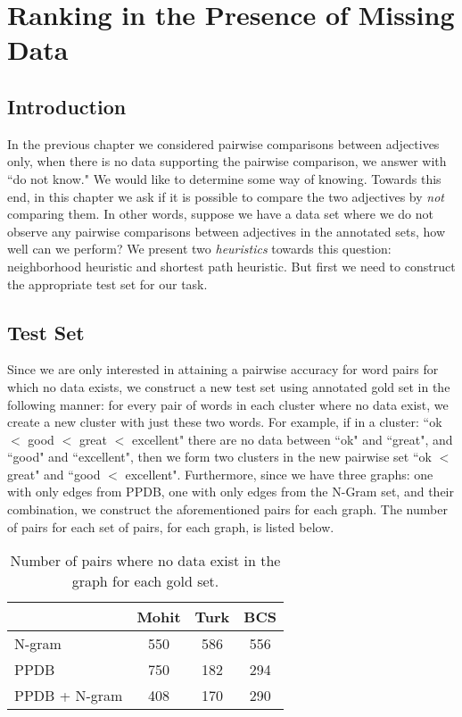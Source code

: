 \section{Ranking in the Presence of Missing Data}

\subsection{Introduction}

In the previous chapter we considered pairwise comparisons between adjectives only, when there is no data supporting the pairwise comparison, we answer with ``do not know."  We would like to determine some way of knowing. Towards this end, in this chapter we ask if it is possible to compare the two adjectives by \textit{not} comparing them. In other words, suppose we have a data set where we do not observe any pairwise comparisons between adjectives in the annotated sets, how well can we perform? We present two \textit{heuristics} towards this question: neighborhood heuristic and shortest path heuristic. But first we need to construct the appropriate test set for our task.


\subsection{Test Set}

Since we are only interested in attaining a pairwise accuracy for word pairs for which no data exists, we construct a new test set using annotated gold set in the following manner: for every pair of words in each cluster where no data exist, we create a new cluster with just these two words. For example, if in a cluster: ``ok $<$ good $<$ great $<$ excellent" there are no data between ``ok" and ``great", and ``good" and ``excellent", then we form two clusters in the new pairwise set ``ok $<$ great" and ``good $<$ excellent". Furthermore, since we have three graphs: one with only edges from PPDB, one with only edges from the N-Gram set, and their combination, we construct the aforementioned pairs for each graph. The number of pairs for each set of pairs, for each graph, is listed below. 


\begin{table}
\small
\centering
\begin{tabular}{|l|c|c|c|}
	\hline 
	& \multicolumn{1}{c|}{Mohit} 
	& \multicolumn{1}{c|}{Turk} 
	& \multicolumn{1}{c|}{BCS} \\
	\hline 
	N-gram          & 550 & 586 & 556 \\
	PPDB            & 750 & 182 & 294 \\
	PPDB + N-gram   & 408 & 170 & 290 \\
	\hline
\end{tabular}
\caption{\label{font-table} Number of pairs where no data exist in the graph for each gold set. }
\end{table}

